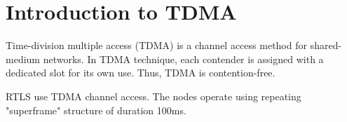 \documentclass[./main.tex]{subfiles}
\begin{document}
\chapter{Introduction to TDMA}

Time-division multiple access (TDMA) is a channel access method for shared-medium networks. In TDMA technique, each contender is assigned with a dedicated slot for its own use. Thus, TDMA is contention-free. 

RTLS use TDMA channel access. The nodes operate using repeating "superframe" structure of duration 100ms.
\end{document}
